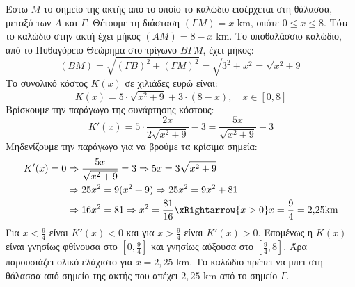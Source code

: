 \begin{center}
\end{center}
Έστω $M$ το σημείο της ακτής από το οποίο το καλώδιο εισέρχεται στη θάλασσα, μεταξύ των $A$ και $\varGamma$. Θέτουμε τη διάσταση $(\varGamma M) = x$ \si{km}, οπότε $0 \le x \le 8$. 
Τότε το καλώδιο στην ακτή έχει μήκος $(AM) = 8 - x$ \si{km}.
Το υποθαλάσσιο καλώδιο, από το Πυθαγόρειο Θεώρημα στο τρίγωνο $B\varGamma M$, έχει μήκος:
\[ (BM) = \sqrt{(\varGamma B)^2 + (\varGamma M)^2} = \sqrt{3^2 + x^2} = \sqrt{x^2 + 9} \]
Το συνολικό κόστος $K(x)$ σε χιλιάδες ευρώ είναι:
\[ K(x) = 5 \cdot \sqrt{x^2 + 9} + 3 \cdot (8 - x), \quad x \in [0, 8] \]
Βρίσκουμε την παράγωγο της συνάρτησης κόστους:
\[ K'(x) = 5 \cdot \frac{2x}{2\sqrt{x^2 + 9}} - 3 = \frac{5x}{\sqrt{x^2 + 9}} - 3 \]
Μηδενίζουμε την παράγωγο για να βρούμε τα κρίσιμα σημεία:
\begin{align*}
K'(x) = 0 &\Rightarrow \frac{5x}{\sqrt{x^2 + 9}} = 3 \Rightarrow 5x = 3\sqrt{x^2 + 9} \\
&\Rightarrow 25x^2 = 9(x^2 + 9) \Rightarrow 25x^2 = 9x^2 + 81 \\
&\Rightarrow 16x^2 = 81 \Rightarrow x^2 = \frac{81}{16} \xRightarrow{x>0} x = \frac{9}{4} = 2{,}25 \si{ km}
\end{align*}
Για $x < \frac{9}{4}$ είναι $K'(x) < 0$ και για $x > \frac{9}{4}$ είναι $K'(x) > 0$. Επομένως η $K(x)$ είναι γνησίως φθίνουσα στο $\left[0, \frac{9}{4}\right]$ και γνησίως αύξουσα στο $\left[\frac{9}{4}, 8\right]$.
Άρα παρουσιάζει ολικό ελάχιστο για $x = 2{,}25$ \si{km}. Το καλώδιο πρέπει να μπει στη θάλασσα από σημείο της ακτής που απέχει $2{,}25$ \si{km} από το σημείο $\varGamma$.\\

